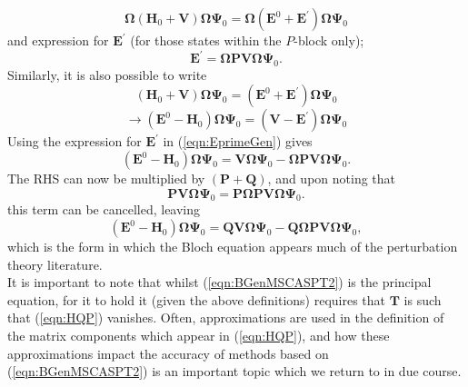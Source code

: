 \begin{equation}
\boldsymbol{\Omega}(\mathbf{H}_{0}+\mathbf{V})\boldsymbol{\Omega}\mathbf{\Psi}_{0} =
\boldsymbol{\Omega}(\mathbf{E}^{0}+\mathbf{E}^{'})\boldsymbol{\Omega}\mathbf{\Psi}_{0}
\label{eqn:WWperturbedHE}
\end{equation}
and expression for $\mathbf{E}^{'}$ (for those states within the $P$-block only);
\begin{equation}
\mathbf{E}^{'} = \boldsymbol{\Omega}\mathbf{P}\mathbf{V}\boldsymbol{\Omega}\mathbf{\Psi}_{0}.
\label{eqn:EprimeGen}
\end{equation}
Similarly, it is also possible to write
\begin{equation*}
(\mathbf{H}_{0}+\mathbf{V})\boldsymbol{\Omega}\mathbf{\Psi}_{0} =
(\mathbf{E}^{0}+\mathbf{E}^{'})\boldsymbol{\Omega}\mathbf{\Psi}_{0}
\end{equation*}
\begin{equation}
\rightarrow
(\mathbf{E}^{0}-\mathbf{H}_{0})\boldsymbol{\Omega}\mathbf{\Psi}_{0} =
 (\mathbf{V}-\mathbf{E}^{'})\boldsymbol{\Omega}\mathbf{\Psi}_{0} 
\label{eqn:WperturbedHE}
\end{equation}
Using the expression for $\mathbf{E}^{'}$ in  (\ref{eqn:EprimeGen}) gives
\begin{equation}
(\mathbf{E}^{0}-\mathbf{H}_{0})\boldsymbol{\Omega}\mathbf{\Psi}_{0} =
\mathbf{V}\boldsymbol{\Omega}\mathbf{\Psi}_{0} - 
\boldsymbol{\Omega}\mathbf{P}\mathbf{V}\boldsymbol{\Omega}\mathbf{\Psi}_{0}.
\label{eqn:BGenIntermediate}
\end{equation}
The RHS can now be multiplied by $(\mathbf{P}+\mathbf{Q})$,  and upon noting that
\begin{equation*}
\mathbf{P}\mathbf{V}\boldsymbol{\Omega}\mathbf{\Psi}_{0} = \mathbf{P}\boldsymbol{\Omega}\mathbf{P}\mathbf{V}\boldsymbol{\Omega}\mathbf{\Psi}_{0}.
\end{equation*}
this term can be cancelled, leaving
\begin{equation}
(\mathbf{E}^{0}-\mathbf{H}_{0})\boldsymbol{\Omega}\mathbf{\Psi}_{0} =
\mathbf{Q}\mathbf{V}\boldsymbol{\Omega}\mathbf{\Psi}_{0} - 
\mathbf{Q}\boldsymbol{\Omega}\mathbf{P}\mathbf{V}\boldsymbol{\Omega}\mathbf{\Psi}_{0},
\label{eqn:BGenMSCASPT2}
\end{equation}
which is the form in which the Bloch equation appears much of the perturbation theory literature.\\

\noindent It is important to note that whilst (\ref{eqn:BGenMSCASPT2}) is the principal equation,
for it to hold it (given the above definitions) requires that $\mathbf{T}$ is such that
(\ref{eqn:HQP}) vanishes. Often, approximations are used in the definition of the matrix components
which appear in (\ref{eqn:HQP}), and how these approximations impact the accuracy of methods based on
(\ref{eqn:BGenMSCASPT2}) is an important topic which we return to in due course.

